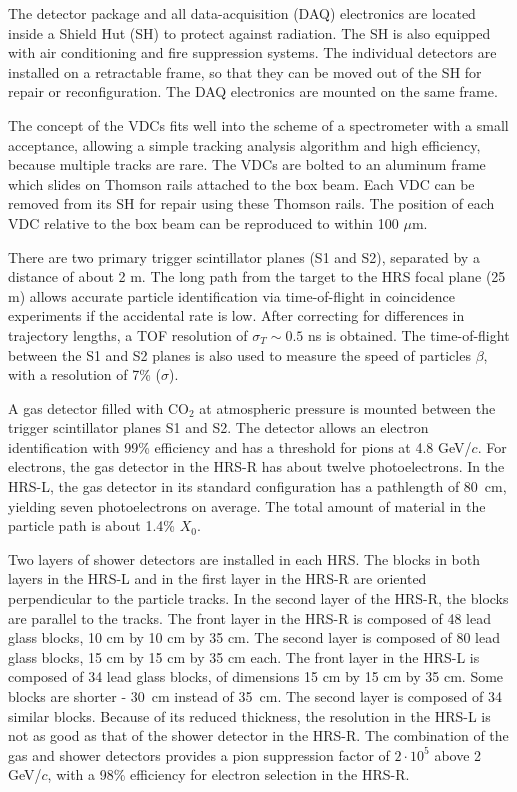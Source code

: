 The detector package and all data-acquisition (DAQ) electronics are located 
inside a Shield Hut (SH) to protect against radiation.
The SH is also equipped with air conditioning and fire
suppression systems. The individual detectors are installed on a 
retractable frame, so that they can be moved out of the SH 
for repair or reconfiguration. 
The DAQ electronics are mounted on the same frame.

The concept of the VDCs fits well into the scheme of a spectrometer with a small 
acceptance, allowing a simple tracking analysis algorithm and high efficiency, 
because multiple tracks are rare.
The VDCs are bolted to an aluminum frame which slides on Thomson rails 
attached to the box beam. 
Each VDC can be removed from its SH for repair using these Thomson rails. 
The position of each VDC relative to the box beam can be reproduced to within 
100 $\mu$m. 

There are two primary trigger scintillator planes (S1 and S2), 
separated by a distance of about 2 m. 
The long path from the target to the HRS focal plane (25 m) allows 
accurate particle identification via time-of-flight in coincidence experiments 
if the accidental rate is low. 
After correcting for differences in trajectory lengths, 
a TOF resolution of $\sigma_T \sim 0.5$ ns is obtained. 
The time-of-flight between the S1 and S2 planes is also used to measure 
the speed of particles $\beta$, with a resolution of 7\% ($\sigma$).

A gas \Cherenkov{} detector filled  with CO$_{2}$ at atmospheric 
pressure is mounted between the trigger scintillator planes S1 and S2. 
The detector allows an electron identification  with 99\% efficiency
and has a threshold for pions at 4.8 GeV/$c$. 
For electrons, the gas \Cherenkov{} detector in the HRS-R has about twelve photoelectrons. 
In the HRS-L, the gas \Cherenkov{} detector in its standard configuration has 
a pathlength of 80~cm, yielding seven photoelectrons on average. 
The total amount of material in the particle path is about 1.4\% $X_0$. 

Two layers of shower detectors are installed in each HRS. 
The blocks in both layers in the HRS-L and in the first 
layer in the HRS-R are oriented perpendicular to the particle tracks. 
In the second layer of the HRS-R, the blocks are parallel to the tracks. 
The front layer in the HRS-R is composed of 48 lead glass blocks, 
10 cm by 10 cm by 35 cm. 
The second layer is composed of 80 lead glass blocks, 
15 cm by 15 cm by 35 cm each.  
The front layer in the HRS-L is composed of 34 lead glass blocks, of 
dimensions 15 cm by 15 cm by 35 cm. Some blocks are shorter - 30~cm 
instead of 35~cm. 
The second layer is  composed of 34 similar blocks. 
Because of its reduced thickness, the resolution in the HRS-L is not as good 
as that of the shower detector in the HRS-R.
The combination of the gas \Cherenkov{} and shower detectors provides a 
pion suppression factor of $2 \cdot 10^{5}$ above 2 GeV/$c$, with a 
98\% efficiency for electron selection in the HRS-R. 

